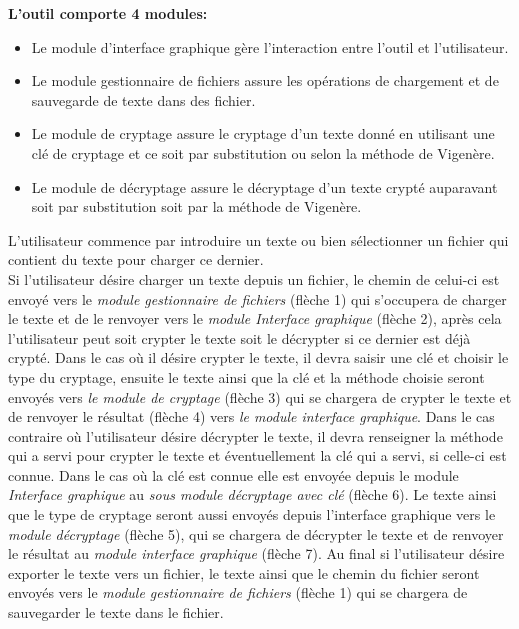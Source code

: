 \documentclass[11pt]{article}
\begin{document}
\textbf{L'outil comporte  4 modules:}
\begin{itemize}[label=\textbullet]
    \item Le module d'interface graphique gère l’interaction entre l'outil et l'utilisateur.
    \item Le module gestionnaire de fichiers assure les opérations de chargement et de sauvegarde de texte dans des fichier.
    \item Le module de cryptage assure le cryptage d'un texte donné en utilisant une clé de cryptage et ce soit par substitution ou selon la méthode de Vigenère.
    \item Le module de décryptage assure le décryptage d'un texte crypté auparavant soit par substitution soit par la méthode de Vigenère.
\end{itemize}
 L'utilisateur commence par introduire un texte ou bien sélectionner un fichier qui contient du texte pour charger ce dernier.
\\Si l'utilisateur désire charger un texte depuis un fichier, le chemin de celui-ci est envoyé vers le \textit{module gestionnaire de fichiers} (flèche 1) qui s'occupera de charger le texte et de le renvoyer vers le \textit{module Interface graphique} (flèche 2), après cela l'utilisateur peut soit crypter le texte soit le décrypter si ce dernier est déjà crypté.
Dans le cas où il désire crypter le texte, il devra saisir une clé et choisir le type du cryptage, ensuite le texte ainsi que la clé et la méthode choisie seront envoyés vers \textit{le module de cryptage} (flèche 3) qui se chargera de crypter le texte et de  renvoyer le résultat (flèche 4) vers \textit{le module interface graphique}.
Dans le cas contraire où l’utilisateur désire décrypter le texte, il devra renseigner la méthode  qui a servi pour crypter le texte  et éventuellement la clé qui a servi, si celle-ci est connue.
Dans le cas où la clé est connue elle est  envoyée depuis le module \textit{Interface graphique} au \textit{sous module décryptage avec clé} (flèche 6).
Le texte ainsi que le type de cryptage seront aussi envoyés depuis l’interface graphique vers le \textit{module décryptage} (flèche 5), qui se chargera de décrypter le texte et de renvoyer le résultat au \textit{module interface graphique} (flèche 7).
Au final si l’utilisateur désire exporter le texte vers un fichier, le texte ainsi que le chemin du fichier seront envoyés vers le \textit{module gestionnaire de fichiers} (flèche 1) qui se chargera de sauvegarder le texte dans le fichier.
\end{document}

